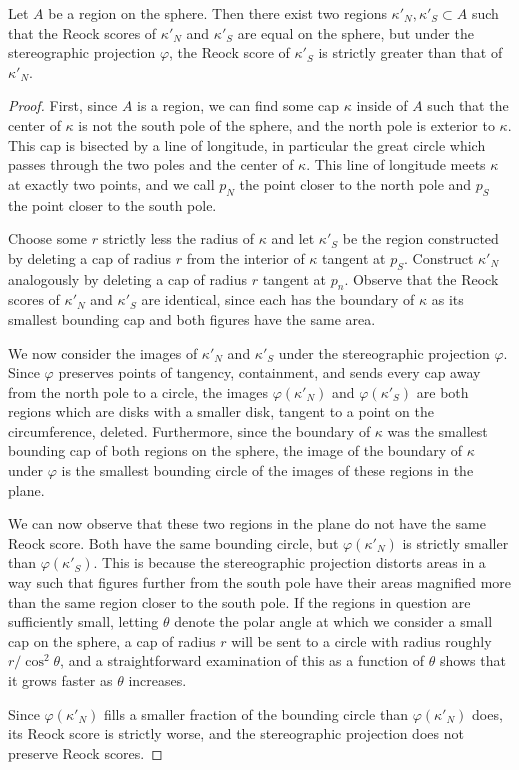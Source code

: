 \begin{theorem}
	Let $A$ be a region on the sphere.  Then there exist two regions $\kappa'_N,\kappa'_S\subset A$ such that the Reock scores of $\kappa'_N$ and $\kappa'_S$ are equal on the sphere, but under the stereographic projection $\varphi$, the Reock score of $\kappa'_S$ is strictly greater than that of $\kappa'_N$. 
\end{theorem}

\begin{proof}
	First, since $A$ is a region, we can find some cap $\kappa$ inside of $A$ such that the center of $\kappa$ is not the south pole of the sphere, and the north pole is exterior to $\kappa$.  This cap is bisected by a line of longitude, in particular the great circle which passes through the two poles and the center of $\kappa$.  This line of longitude meets $\kappa$ at exactly two points, and we call $p_N$ the point closer to the north pole and $p_S$ the point closer to the south pole.
	
	Choose some $r$ strictly less the radius of $\kappa$ and let $\kappa'_S$ be the region constructed by deleting a cap of radius $r$ from the interior of $\kappa$ tangent at $p_S$.  Construct $\kappa'_N$ analogously by deleting a cap of radius $r$ tangent at $p_n$. Observe that the Reock scores of $\kappa'_N$ and $\kappa'_S$ are identical, since each has the boundary of $\kappa$ as its smallest bounding cap and both figures have the same area.
	
	We now consider the images of $\kappa'_N$ and $\kappa'_S$ under the stereographic projection $\varphi$.  Since $\varphi$ preserves points of tangency, containment, and sends every cap away from the north pole to a circle, the images $\varphi(\kappa'_N)$ and $\varphi(\kappa'_S)$ are both regions which are disks with a smaller disk, tangent to a point on the circumference, deleted.  Furthermore, since the boundary of $\kappa$ was the smallest bounding cap of both regions on the sphere, the image of the boundary of $\kappa$ under $\varphi$ is the smallest bounding circle of the images of these regions in the plane.
	
	We can now observe that these two regions in the plane do not have the same Reock score.  Both have the same bounding circle, but $\varphi(\kappa'_N)$ is strictly smaller than $\varphi(\kappa'_S)$.  This is because the stereographic projection distorts areas in a way such that figures further from the south pole have their areas magnified more than the same region closer to the south pole.  If the regions in question are sufficiently small, letting $\theta$ denote the polar angle at which we consider a small cap on the sphere, a cap of radius $r$ will be sent to a circle with radius roughly $r/\cos^2{\theta}$, and a straightforward examination of this as a function of $\theta$ shows that it grows faster as $\theta$ increases.
	
	Since $\varphi(\kappa'_N)$ fills a smaller fraction of the bounding circle than $\varphi(\kappa'_N)$ does, its Reock score is strictly worse, and the stereographic projection does not preserve Reock scores.
\end{proof}